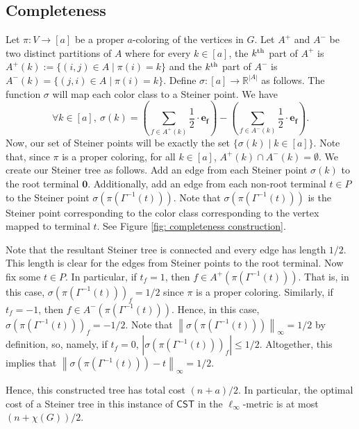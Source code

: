 \documentclass{theoretics}
\newcommand{\R}{\mathbb{R}}
\newcommand{\1}{\textbf{1}}
\newcommand{\norm}[1]{\left\lVert#1\right\rVert}
\newcommand{\cst}{$\mathsf{CST}$\xspace}
\begin{document}
\subsection{Completeness} \label{sec: l_inf completeness}
Let $\pi: V \to [a]$ be a proper $a$-coloring of the vertices in $G$. Let $A^+$ and $A^-$ be two distinct partitions of $A$ where for every  $k\in[a]$, the $k\textsuperscript{th} $ part of $A^+$ is $A^+(k):=  \{(i,j) \in A\mid \pi(i)=k\}$ and the $k\textsuperscript{th} $ part of $A^-$ is  $A^-(k) =  \{(j,i) \in A\mid \pi(i)=k\}$. Define $\sigma : [a] \to \R^{|A|}$ as follows. The function $\sigma$ will map each color class to a Steiner point. We have 
\[\forall k\in[a],\  
\sigma(k) = \left(\sum_{f \in A^+(k)} \frac{1}{2} \cdot \mathbf{e_{f}}\right) - \left(\sum_{f \in A^-(k)}\frac{1}{2} \cdot \mathbf{e_{f}}\right).
\]
Now, our set of Steiner points will be exactly the set 
$\{\sigma(k)\mid k\in [a]\}$. Note that, since $\pi$ is a proper coloring, for all $k \in [a]$, $A^+(k) \cap A^-(k) = \emptyset$. We create our Steiner tree as follows. Add an edge from each Steiner point $\sigma(k)$ to the root terminal $\mathbf{0}$. Additionally, add an edge from each non-root terminal $t \in P$ to the Steiner point $\sigma(\pi(\Gamma^{-1}(t)))$. Note that $\sigma(\pi(\Gamma^{-1}(t)))$ is the Steiner point corresponding to the color class corresponding to the vertex mapped to terminal $t$. See Figure \ref{fig: completeness construction}.

Note that the resultant Steiner tree is connected and every edge has length $1/2$. This length is clear for the edges from Steiner points to the root terminal. Now fix some $t \in P$. In particular, if $t_f = 1$, then $f \in A^+(\pi(\Gamma^{-1}(t))).$ That is, in this case, $\sigma(\pi(\Gamma^{-1}(t)))_f = 1/2$ since $\pi$ is a proper coloring. Similarly, if $t_f = -1$, then $f \in A^-(\pi(\Gamma^{-1}(t)))$. Hence, in this case, $\sigma(\pi(\Gamma^{-1}(t)))_f = -1/2$.  Note that $\norm{\sigma(\pi(\Gamma^{-1}(t)))}_{\infty} = 1/2$ by definition, so, namely, if $t_f = 0$, $|\sigma(\pi(\Gamma^{-1}(t)))_f| \leq 1/2$. Altogether, this implies that $\norm{\sigma(\pi(\Gamma^{-1}(t))) - t}_{\infty} = 1/2$.

Hence, this constructed tree has total cost $(n + a)/2$. In particular, the optimal cost of a Steiner tree in this instance of \cst in the $\ell_{\infty}$-metric is at most $(n + \chi(G))/2$.
\end{document}

